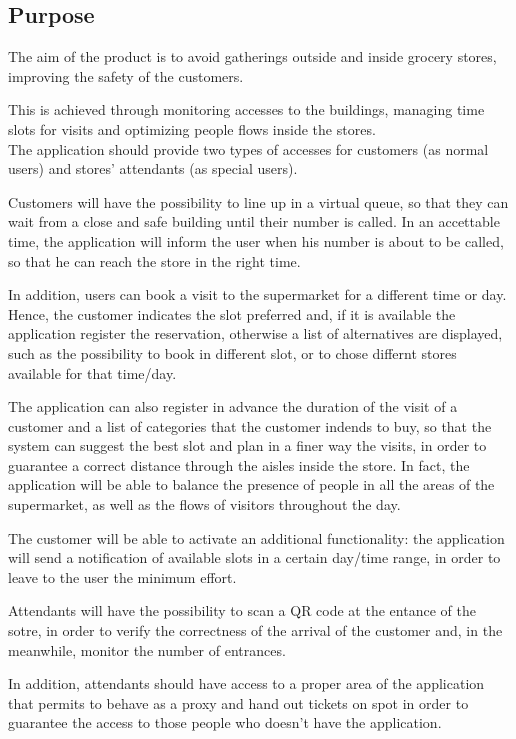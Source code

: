 \documentclass[12pt]{article}
\begin{document}
\subsection{Purpose}
The aim of the product is to avoid gatherings outside and inside grocery stores,  improving the safety of the customers.

This is achieved through monitoring accesses to the buildings, managing time slots for visits and optimizing people flows inside the stores.\\

The application should provide two types of accesses for customers (as normal users) and stores' attendants (as special users).

Customers will have the possibility to line up in a virtual queue, so that they can wait from a close and safe building until their number is called. In an accettable time, the application will inform the user when his number is about to be called, so that he can reach the store in the right time.

In addition, users can book a visit to the supermarket for a different time or day. Hence, the customer indicates the slot preferred and, if it is available the application register the reservation, otherwise a list of alternatives are displayed, such as the possibility to book in different slot, or to chose differnt stores available for that time/day.

The application can also register in advance the duration of the visit of a customer and a list of categories that the customer indends to buy, so that the system can suggest the best slot and plan in a finer way the visits, in order to guarantee a correct distance through the aisles inside the store. In fact, the application will be able to balance the presence of people in all the areas of the supermarket, as well as the flows of visitors throughout the day.

The customer will be able to activate an additional functionality: the application will send a notification of available slots in a certain day/time range, in order to leave to the user the minimum effort.

Attendants will have the possibility to scan a QR code at the entance of the sotre, in order to verify the correctness of the arrival of the customer and, in the meanwhile, monitor the number of entrances.

In addition, attendants should have access to a proper area of the application that permits to behave as a proxy and hand out tickets on spot in order to guarantee the access to those people who doesn't have the application.
\end{document}
